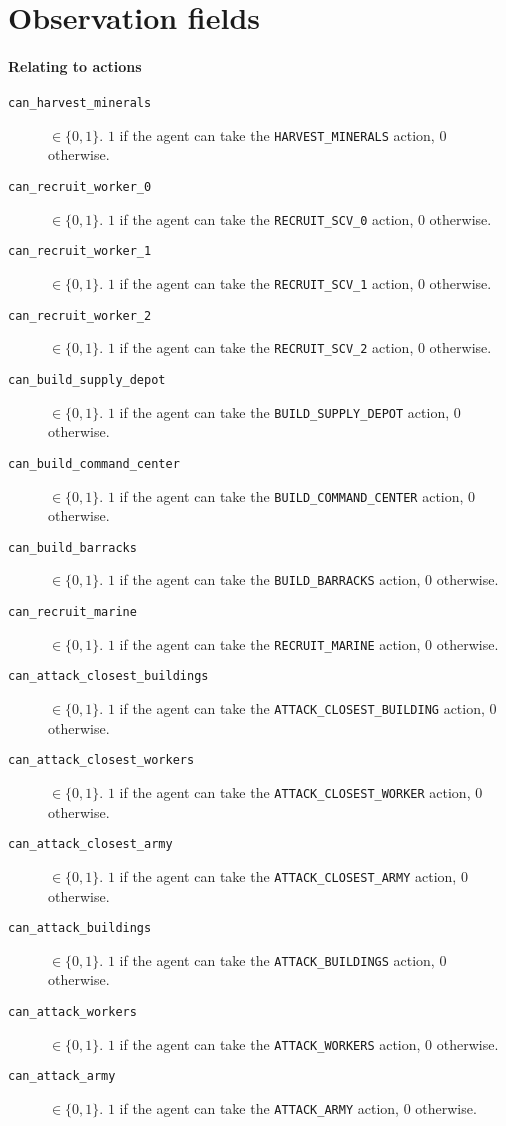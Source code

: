 \chapter{Observation fields}
\label{app:observation}

\subsubsection*{Relating to actions}
\begin{description}
    \item[\texttt{can\_harvest\_minerals}] $\in \{0,1\}$. $1$ if the agent can take the \texttt{HARVEST\_MINERALS} action, $0$ otherwise.
    \item[\texttt{can\_recruit\_worker\_0}] $\in \{0,1\}$. $1$ if the agent can take the \texttt{RECRUIT\_SCV\_0} action, $0$ otherwise.
    \item[\texttt{can\_recruit\_worker\_1}] $\in \{0,1\}$. $1$ if the agent can take the \texttt{RECRUIT\_SCV\_1} action, $0$ otherwise.
    \item[\texttt{can\_recruit\_worker\_2}] $\in \{0,1\}$. $1$ if the agent can take the \texttt{RECRUIT\_SCV\_2} action, $0$ otherwise.
    \item[\texttt{can\_build\_supply\_depot}] $\in \{0,1\}$. $1$ if the agent can take the \texttt{BUILD\_SUPPLY\_DEPOT} action, $0$ otherwise.
    \item[\texttt{can\_build\_command\_center}] $\in \{0,1\}$. $1$ if the agent can take the \texttt{BUILD\_COMMAND\_CENTER} action, $0$ otherwise.
    \item[\texttt{can\_build\_barracks}] $\in \{0,1\}$. $1$ if the agent can take the \texttt{BUILD\_BARRACKS} action, $0$ otherwise.
    \item[\texttt{can\_recruit\_marine}] $\in \{0,1\}$. $1$ if the agent can take the \texttt{RECRUIT\_MARINE} action, $0$ otherwise.
    \item[\texttt{can\_attack\_closest\_buildings}] $\in \{0,1\}$. $1$ if the agent can take the \texttt{ATTACK\_CLOSEST\_BUILDING} action, $0$ otherwise.
    \item[\texttt{can\_attack\_closest\_workers}] $\in \{0,1\}$. $1$ if the agent can take the \texttt{ATTACK\_CLOSEST\_WORKER} action, $0$ otherwise.
    \item[\texttt{can\_attack\_closest\_army}] $\in \{0,1\}$. $1$ if the agent can take the \texttt{ATTACK\_CLOSEST\_ARMY} action, $0$ otherwise.
    \item[\texttt{can\_attack\_buildings}] $\in \{0,1\}$. $1$ if the agent can take the \texttt{ATTACK\_BUILDINGS} action, $0$ otherwise.
    \item[\texttt{can\_attack\_workers}] $\in \{0,1\}$. $1$ if the agent can take the \texttt{ATTACK\_WORKERS} action, $0$ otherwise.
    \item[\texttt{can\_attack\_army}] $\in \{0,1\}$. $1$ if the agent can take the \texttt{ATTACK\_ARMY} action, $0$ otherwise.
\end{description}

